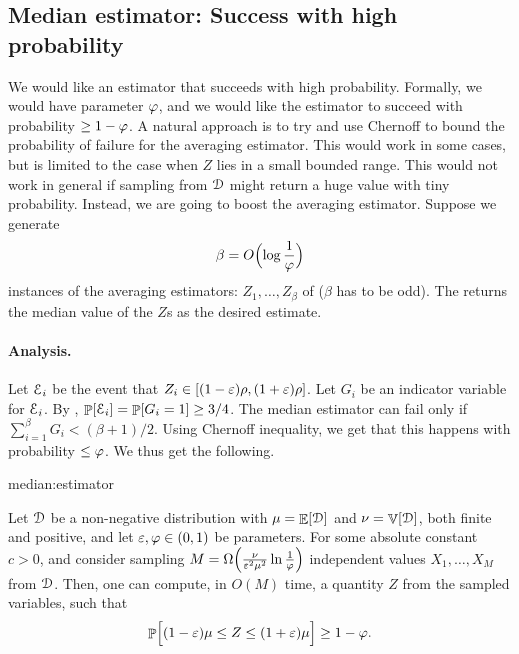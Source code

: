 \subsection{Median estimator: Success with high probability}

We would like an estimator that succeeds with high probability.
Formally, we would have parameter $\varphi$, and we would like the
estimator to succeed with probability $\geq 1 - \varphi$.  A natural
approach is to try and use Chernoff to bound the probability of failure
for the averaging estimator. This would work in some cases, but is
limited to the case when $Z$ lies in a small bounded range. This would
not work in general if sampling from $\EuScript{D}$ might return a huge
value with tiny probability. Instead, we are going to boost the averaging
estimator. Suppose we generate
\begin{equation*}
    \beta = O\Bigl( \log \frac{1}{\varphi } \Bigr)
\end{equation*}
instances of the averaging estimators: $Z_1, \ldots, Z_\beta$ of
 ($\beta$ has to be odd). The
 returns the median
value of the $Z$s as the desired estimate.

\paragraph*{Analysis.}

Let $\EuScript{E}_i$ be the event that $Z_i \in [(1-{\varepsilon})\rho, (1+{\varepsilon})\rho]$.  Let
$G_i$ be an indicator variable for $\EuScript{E}_i$. By
, $\Prob{\Event_i} = \Prob{G_i=1} \geq 3/4$.
The median estimator can fail only if
$\sum_{i=1}^\beta G_i < (\beta+1)/2$. Using Chernoff inequality, we get
that this happens with probability $\leq \varphi$. We thus get the
following.



\begin{fragment}{median:estimator}
\begin{theorem}
    Let $\EuScript{D}$ be a non-negative distribution with
    $\mu = \mathop{\mathbb{E}}\!\left[ {\EuScript{D}} \right]$ and $\nu = \mathop{\mathbb{V}}\!\left[ {\EuScript{D}} \right]$, both finite
    and positive, and let ${\varepsilon}, \varphi \in (0,1)$ be parameters.  For some
    absolute constant $c >0$, and consider sampling
    \begin{math}
        M = \Omega\pth{ \frac{ \nu}{\eps^2\mu^2} \ln \frac{1}{\BadProb} }
    \end{math}
    independent values $X_1, \ldots, X_M$ from $\EuScript{D}$. Then, one can
    compute, in $O(M)$ time, a quantity $Z$ from the sampled variables,
    such that
    \begin{equation*}
        \Prob{ (1-\eps)\mu \leq Z \leq (1+\eps)\mu \Bigr.} \geq 1 -
        \BadProb.
    \end{equation*}
\end{theorem}
\end{fragment}

